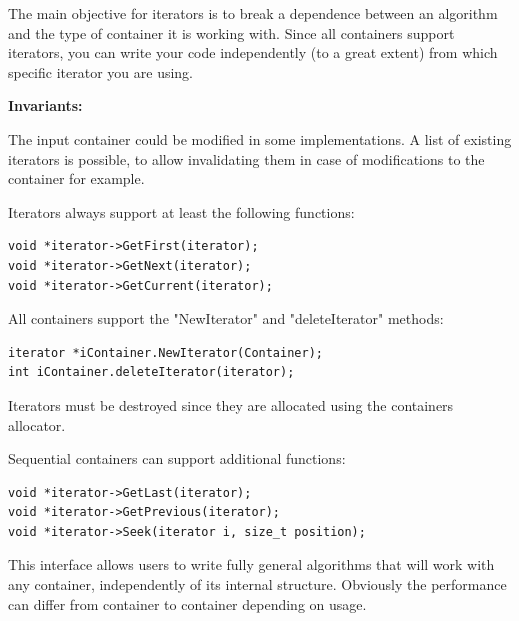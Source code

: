 \documentclass[12pt,a4paper]{memoir} %
\newcommand{\Const}{
{\par\noindent \textbf{Invariants:}\noindent}
}
\begin{document}
The main objective for iterators is to break a dependence between an algorithm and the type of container it is working with. Since all containers
support iterators, you can write your code independently (to a great extent) from which specific iterator you are using.
\Const The input container could be modified in some implementations. A list of existing iterators is possible, to allow invalidating them in case of
modifications to the container for example.

Iterators always support at least the following functions:
\begin{verbatim}
void *iterator->GetFirst(iterator);
void *iterator->GetNext(iterator);
void *iterator->GetCurrent(iterator);
\end{verbatim}
All containers support the "NewIterator"  and "deleteIterator" methods:
\begin{verbatim}
iterator *iContainer.NewIterator(Container); 
int iContainer.deleteIterator(iterator);
\end{verbatim}
Iterators must be destroyed since they are allocated using the containers allocator.

Sequential containers can support additional functions:
\begin{verbatim}
void *iterator->GetLast(iterator);
void *iterator->GetPrevious(iterator);
void *iterator->Seek(iterator i, size_t position);
\end{verbatim}
This interface allows users to write fully general algorithms that will work with any container, independently of its internal structure. Obviously the 
performance can differ from container to container depending on usage.
\end{document}

